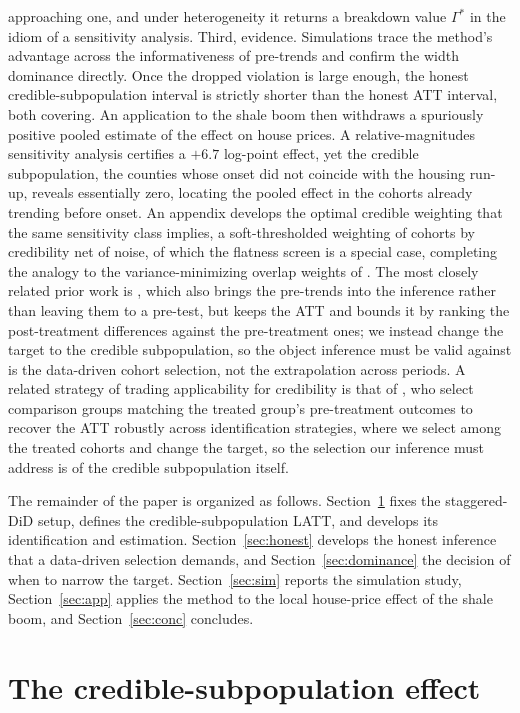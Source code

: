 \documentclass[12pt]{article}
\theoremstyle{remark}
\begin{document}
approaching one, and under heterogeneity it returns a breakdown value $\Gamma^\ast$ in the idiom of a
sensitivity analysis. Third, evidence. Simulations trace the method's advantage across the
informativeness of pre-trends and confirm the width dominance directly. Once the dropped violation is large
enough, the honest credible-subpopulation interval is strictly shorter than the honest ATT interval, both
covering. An
application to the shale boom then withdraws a spuriously positive pooled estimate of the effect on house prices.
A relative-magnitudes sensitivity analysis certifies a $+6.7$ log-point effect, yet the credible
subpopulation, the counties whose onset did not coincide with the housing run-up, reveals essentially zero,
locating the pooled effect in the cohorts already trending before onset. An appendix develops the optimal credible
weighting that the same sensitivity class implies, a soft-thresholded
weighting of cohorts by credibility net of noise, of which the flatness screen is a special case,
completing the analogy to the variance-minimizing overlap weights of \citet{crump2009}. The most closely
related prior work is \citet{dechaisemartin2026}, which also brings the pre-trends into the inference rather
than leaving them to a pre-test, but keeps the ATT and bounds it by ranking the post-treatment differences
against the pre-treatment ones; we instead change the target to the credible subpopulation, so the object
inference must be valid against is the data-driven cohort selection, not the extrapolation across periods.
A related strategy of trading applicability for credibility is that of \citet{callaway2025beyond}, who
select comparison groups matching the treated group's pre-treatment outcomes to recover the ATT robustly
across identification strategies, where we select among the treated cohorts and change the target, so the
selection our inference must address is of the credible subpopulation itself.

The remainder of the paper is organized as follows. Section~\ref{sec:approach} fixes the staggered-DiD
setup, defines the credible-subpopulation LATT, and develops its identification and estimation.
Section~\ref{sec:honest} develops the honest inference that a data-driven selection demands, and
Section~\ref{sec:dominance} the decision of when to narrow the target. Section~\ref{sec:sim} reports the
simulation study,
Section~\ref{sec:app} applies the method to the local house-price effect of the shale boom, and
Section~\ref{sec:conc} concludes.

\section{The credible-subpopulation effect}\label{sec:approach}
\end{document}
